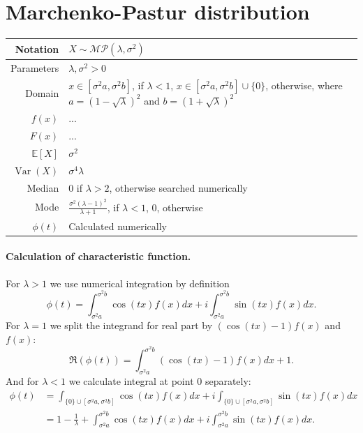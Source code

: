 \documentclass[a4paper,11pt]{article}
\theoremstyle{plain}
\theoremstyle{definition}
\newcommand{\ME}{\mathbb{E}}
\newcommand{\Var}{\operatorname{Var}}
\begin{document}
	\section{Marchenko-Pastur distribution}
	\begin{center}
		\begin{tabular}{| r | l |}
			\hline
			Notation & $X \sim \mathcal{MP}(\lambda, \sigma^2)$ \\
			\hline
			Parameters & $\lambda, \sigma^2 > 0$ \\
			\hline
			Domain & 
			\pbox{\linewidth}{$x \in [\sigma^2 a, \sigma^2 b]$, if  $\lambda < 1$, \\  $ x \in [\sigma^2 a, \sigma^2 b] \cup \{0\} $, otherwise, \\ where $a=(1-\sqrt{\lambda})^2$ and $b=(1+\sqrt{\lambda})^2$} \\
			\hline
			$f(x)$ & ...  \\
			\hline
			$F(x)$ & ... \\
			\hline
			$\ME[X]$ & $ \sigma^2 $ \\
			\hline
			$\Var(X)$ & $\sigma^4 \lambda $ \\
			\hline
			Median & $0$ if $\lambda > 2$, otherwise searched numerically \\
			\hline
			Mode & \pbox{\linewidth}{$\frac{\sigma^2(\lambda - 1)^2}{\lambda+1}$, if  $\lambda < 1$, \\  $ 0 $, otherwise } \\
			\hline
			$\phi(t)$ & Calculated numerically \\
			\hline
		\end{tabular}
	\end{center}
	
	\paragraph{Calculation of characteristic function.}
	For $\lambda > 1$ we use numerical integration by definition
	\[
	\phi(t) = \int_{\sigma^2 a}^{\sigma^2 b} \cos(tx) f(x) dx + i \int_{\sigma^2 a}^{\sigma^2 b}  \sin(tx) f(x) dx.
	\]
	For $\lambda = 1$ we split the integrand for real part by $(\cos(tx) - 1) f(x)$ and $f(x)$:
	\[ \Re(\phi(t)) =  \int_{\sigma^2 a}^{\sigma^2 b} (\cos(tx)-1) f(x) dx + 1.\]
	And for $\lambda < 1$ we calculate integral at point $0$ separately:
	\[
	\begin{aligned}
	\phi(t) & = \int_{ \{0\} \cup [\sigma^2 a, \sigma^2 b]} \cos(tx) f(x) dx + i \int_{ \{0\} \cup [\sigma^2 a, \sigma^2 b]} \sin(tx) f(x) dx  \\ 
	& = 1-\frac{1}{\lambda} + \int_{\sigma^2 a}^{\sigma^2 b} \cos(tx) f(x) dx + i \int_{\sigma^2 a}^{\sigma^2 b}  \sin(tx) f(x) dx.
	\end{aligned}
	\]
	
\end{document}
